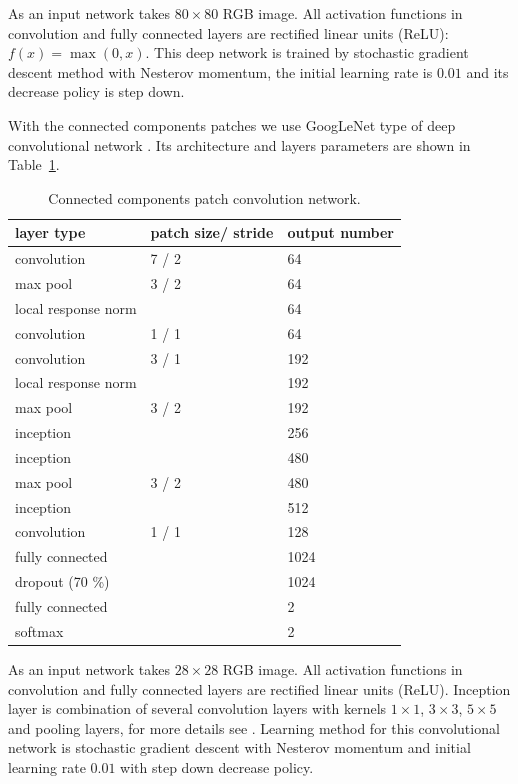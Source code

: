 \documentclass[a4paper,conference]{IEEEtran}
\begin{document}

As an input network takes $80\times80$ RGB image. All activation functions in convolution and fully connected layers are rectified linear units (ReLU): $f(x)=\max(0, x)$. This deep network is trained by stochastic gradient descent method with Nesterov momentum, the initial learning rate is $0.01$ and its decrease policy is step down. 

With the connected components patches we use GoogLeNet type of deep convolutional network \cite{Googlenet}. Its architecture and layers parameters are shown in Table~\ref{googlenet_tab}.
\begin{table}[!t]
\centering
\caption{Connected components patch convolution network.}
\label{googlenet_tab}
\begin{tabular}{|l|p{1.3cm}|p{1.3cm}|}
\hline
\textbf{layer type} & \textbf{patch size/ stride} & \textbf{output number}  \\
\hline
convolution & 7 / 2 & 64 \\
\hline
max pool & 3 / 2 & 64 \\
\hline
local response norm & & 64 \\
\hline
convolution & 1 / 1 & 64 \\
\hline
convolution & 3 / 1 & 192 \\
\hline
local response norm & & 192 \\
\hline
max pool & 3 / 2 & 192 \\
\hline
inception &  & 256 \\
\hline
inception &  & 480 \\
\hline
max pool & 3 / 2 & 480 \\
\hline
inception &  & 512 \\
\hline
convolution & 1 / 1 & 128 \\
\hline
fully connected & & 1024 \\
\hline
dropout (70 \%) & & 1024 \\
\hline
fully connected & & 2 \\
\hline
softmax & & 2 \\
\hline
\end{tabular}
\end{table}		

As an input network takes $28\times28$ RGB image. All activation functions in convolution and fully connected layers are rectified linear units (ReLU). Inception layer is combination of several convolution layers with kernels $1\times1$, $3\times3$, $5\times5$ and pooling layers, for more details see \cite{Googlenet}. Learning method for this convolutional network is stochastic gradient descent with Nesterov momentum and initial learning rate $0.01$ with step down decrease policy.
\end{document}
